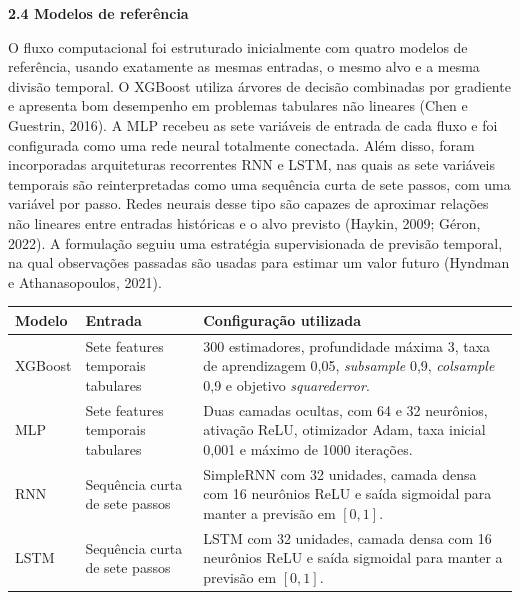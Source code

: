 \documentclass[12pt,a4paper]{article}
\begin{document}
\vspace{12pt}

\noindent\textbf{2.4 Modelos de referência}

O fluxo computacional foi estruturado inicialmente com quatro modelos de referência, usando exatamente as mesmas entradas, o mesmo alvo e a mesma divisão temporal. O XGBoost utiliza árvores de decisão combinadas por gradiente e apresenta bom desempenho em problemas tabulares não lineares (Chen e Guestrin, 2016). A MLP recebeu as sete variáveis de entrada de cada fluxo e foi configurada como uma rede neural totalmente conectada. Além disso, foram incorporadas arquiteturas recorrentes RNN e LSTM, nas quais as sete variáveis temporais são reinterpretadas como uma sequência curta de sete passos, com uma variável por passo. Redes neurais desse tipo são capazes de aproximar relações não lineares entre entradas históricas e o alvo previsto (Haykin, 2009; Géron, 2022). A formulação seguiu uma estratégia supervisionada de previsão temporal, na qual observações passadas são usadas para estimar um valor futuro (Hyndman e Athanasopoulos, 2021).

\vspace{6pt}

\begin{center}
\small
\begin{tabular}{p{2.2cm}p{5.0cm}p{6.6cm}}
\toprule
\textbf{Modelo} & \textbf{Entrada} & \textbf{Configuração utilizada} \\
\midrule
XGBoost & Sete features temporais tabulares & 300 estimadores, profundidade máxima 3, taxa de aprendizagem 0,05, \textit{subsample} 0,9, \textit{colsample} 0,9 e objetivo \textit{squarederror}. \\
MLP & Sete features temporais tabulares & Duas camadas ocultas, com 64 e 32 neurônios, ativação ReLU, otimizador Adam, taxa inicial 0,001 e máximo de 1000 iterações. \\
RNN & Sequência curta de sete passos & SimpleRNN com 32 unidades, camada densa com 16 neurônios ReLU e saída sigmoidal para manter a previsão em $[0,1]$. \\
LSTM & Sequência curta de sete passos & LSTM com 32 unidades, camada densa com 16 neurônios ReLU e saída sigmoidal para manter a previsão em $[0,1]$. \\
\bottomrule
\end{tabular}
\end{center}

\vspace{6pt}
\end{document}
